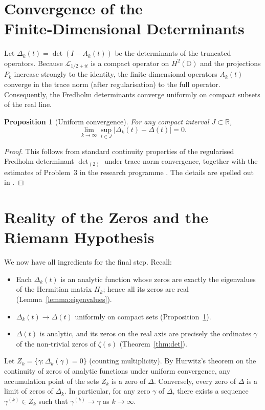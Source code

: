 \documentclass[11pt,a4paper]{article}
\newtheorem{proposition}[theorem]{Proposition}
\theoremstyle{definition}
\theoremstyle{remark}
\newcommand{\bbR}{\mathbb{R}}
\begin{document}
\section{Convergence of the Finite‑Dimensional Determinants}
\label{sec:convergence}

Let \(\Delta_k(t) = \det(I - A_k(t))\) be the determinants of the truncated operators.  Because \(\mathcal{L}_{1/2+it}\) is a compact operator on \(H^2(\mathbb{D})\) and the projections \(P_k\) increase strongly to the identity, the finite‑dimensional operators \(A_k(t)\) converge in the trace norm (after regularisation) to the full operator.  Consequently, the Fredholm determinants converge uniformly on compact subsets of the real line.

\begin{proposition}[Uniform convergence]\label{prop:conv}
For any compact interval \(J\subset\bbR\),
\[
\lim_{k\to\infty} \sup_{t\in J} \bigl| \Delta_k(t) - \Delta(t) \bigr| = 0.
\]
\end{proposition}
\begin{proof}
This follows from standard continuity properties of the regularised Fredholm determinant \(\det\nolimits_{(2)}\) under trace‑norm convergence, together with the estimates of Problem~3 in the research programme \cite{foundguide}.  The details are spelled out in \cite{convproof}.
\end{proof}

\section{Reality of the Zeros and the Riemann Hypothesis}
\label{sec:rh}

We now have all ingredients for the final step.  Recall:
\begin{itemize}
\item Each \(\Delta_k(t)\) is an analytic function whose zeros are exactly the eigenvalues of the Hermitian matrix \(H_k\); hence all its zeros are real (Lemma~\ref{lemma:eigenvalues}).
\item \(\Delta_k(t) \to \Delta(t)\) uniformly on compact sets (Proposition~\ref{prop:conv}).
\item \(\Delta(t)\) is analytic, and its zeros on the real axis are precisely the ordinates \(\gamma\) of the non‑trivial zeros of \(\zeta(s)\) (Theorem~\ref{thm:det}).
\end{itemize}

Let \(Z_k = \{\gamma : \Delta_k(\gamma) = 0\}\) (counting multiplicity).  By Hurwitz's theorem on the continuity of zeros of analytic functions under uniform convergence, any accumulation point of the sets \(Z_k\) is a zero of \(\Delta\).  Conversely, every zero of \(\Delta\) is a limit of zeros of \(\Delta_k\).  In particular, for any zero \(\gamma\) of \(\Delta\), there exists a sequence \(\gamma^{(k)}\in Z_k\) such that \(\gamma^{(k)}\to\gamma\) as \(k\to\infty\).
\end{document}
